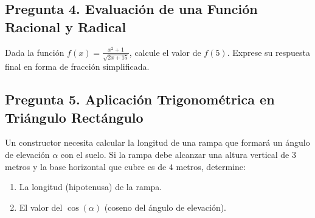\documentclass{article}
\begin{document}
\vspace{2.0cm}

\subsection*{Pregunta 4. Evaluación de una Función Racional y Radical}
Dada la función $f(x) = \frac{x^2 + 1}{\sqrt{2x + 15}}$, calcule el valor de $f(5)$. Exprese su respuesta final en forma de fracción simplificada.

\vspace{2.0cm}

\subsection*{Pregunta 5. Aplicación Trigonométrica en Triángulo Rectángulo}
Un constructor necesita calcular la longitud de una rampa que formará un ángulo de elevación $\alpha$ con el suelo. Si la rampa debe alcanzar una altura vertical de $3$ metros y la base horizontal que cubre es de $4$ metros, determine:
\begin{enumerate}
    \item La longitud (hipotenusa) de la rampa.
    \item El valor del $\cos(\alpha)$ (coseno del ángulo de elevación).
\end{enumerate}

\vspace{2.0cm}
\end{document}
